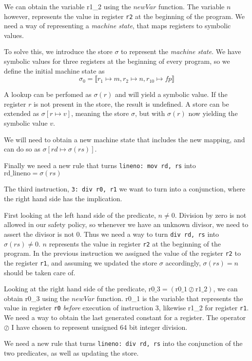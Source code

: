 We can obtain the variable r1\_2 using the $newVar$ function. The variable $n$ however, represents the value in register \texttt{r2} at the beginning of the program. We need a way of representing a \textit{machine state}, that maps registers to symbolic values.

To solve this, we introduce the store $\sigma$ to represent the \textit{machine state}. We have symbolic values for three registers at the beginning of every program, so we define the initial machine state as \[\sigma_0 = \llbracket r_1 \mapsto m, r_2 \mapsto n, r_{10} \mapsto fp \rrbracket \]

A lookup can be perfomed as $\sigma(r)$ and will yield a symbolic value. If the register $r$ is not present in the store, the result is undefined. 
A store can be extended as $\sigma[r \mapsto v]$, meaning the store $\sigma$, but with $\sigma(r)$ now yielding the symbolic value $v$.

We will need to obtain a new machine state that includes the new mapping, and can do so as $\sigma[rd \mapsto \sigma(rs)]$.

Finally we need a new rule that turns \texttt{lineno: mov rd, rs} into $\text{rd\_lineno} = \sigma(rs)$


The third instruction,  \texttt{3: div r0, r1} we want to turn into a conjunction, where the right hand side has the implication.


First looking at the left hand side of the predicate, $n \neq 0$.
Division by zero is not allowed in our safety policy, so whenever we have an unknown divisor, we need to assert the divisor is not 0. Thus we need a way to turn \texttt{div rd, rs} into $\sigma(rs) \neq 0$.
$n$ represents the value in register \texttt{r2} at the beginning of the program. In the previous instruction we assigned the value of the register \texttt{r2} to the register \texttt{r1}, and assuming we updated the store $\sigma$ accordingly, $\sigma(rs) = n$ should be taken care of. 


Looking at the right hand side of the predicate, $\text{r0\_3} = (\text{r0\_1} \oslash \text{r1\_2})$, we can obtain r0\_3 using the $newVar$ function. r0\_1 is the variable that represents the value in register \texttt{r0} \textit{before} execution of instruction 3, likewise r1\_2 for register \texttt{r1}. We need a way to obtain the last generated constant for a register.
The operator $\oslash$ I have chosen to represent unsigned 64 bit integer division.

We need a new rule that turns \texttt{lineno: div rd, rs} into the conjunction of the two predicates, as well as updating the store.

